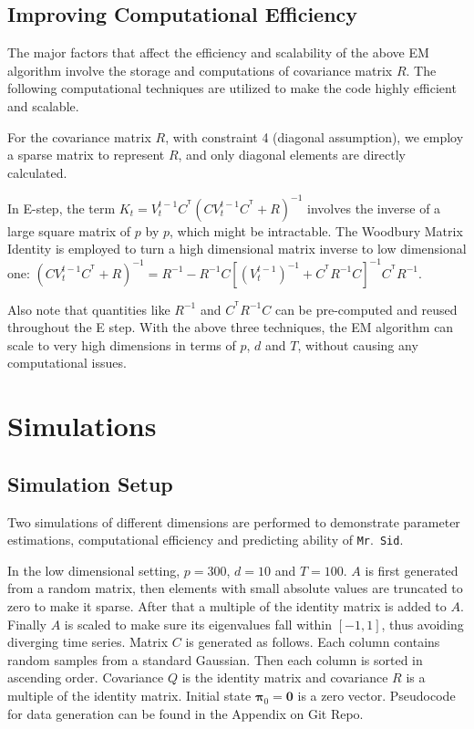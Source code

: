\documentclass[fleqn,12pt]{article}
\newcommand{\T}{^{\ensuremath{\mathsf{T}}}}           %
\newcommand{\mrsid}{{\sc \texttt{Mr}.~\texttt{Sid}}}
\begin{document}
\subsection{Improving Computational Efficiency}
The major factors that affect the efficiency and scalability of the above EM algorithm involve the storage and computations of covariance matrix $R$. The following computational techniques are utilized to make the code highly efficient and scalable.

For the covariance matrix $R$, with constraint 4 (diagonal assumption), we employ a sparse matrix to represent $R$, and only diagonal elements are directly calculated. 

In E-step, the term $K_t=V_t^{t-1}C^{\T}(CV_t^{t-1}C^{\T}+R)^{-1}$ involves the inverse of a large square matrix of $p$ by $p$, which might be intractable. The Woodbury Matrix Identity is employed to turn a high dimensional matrix inverse to low dimensional one: $(CV_t^{t-1}C^{\T}+R)^{-1} = R^{-1} - R^{-1}C[(V_t^{t-1})^{-1} + C^{\T}R^{-1}C]^{-1}C^{\T}R^{-1}$.

Also note that quantities like $R^{-1}$ and $C^{\T}R^{-1}C$ can be pre-computed and reused throughout the E step. With the above three techniques, the EM algorithm can scale to very high dimensions in terms of $p$, $d$ and $T$, without causing any computational issues.


\section{Simulations}
\subsection{Simulation Setup}
\label{sec:simsetup}
Two simulations of different dimensions are performed to demonstrate parameter estimations, computational efficiency and predicting ability of \mrsid.

In the low dimensional setting, $p = 300$, $d = 10$ and $T = 100$. $A$ is first generated from a random matrix, then elements with small absolute values are truncated to zero to make it sparse. After that a multiple of the identity matrix is added to $A$. Finally $A$ is scaled to make sure its eigenvalues fall within $[-1,1]$, thus avoiding diverging time series. Matrix $C$ is generated as follows. Each column contains random samples from a standard Gaussian. Then each column is sorted in ascending order. Covariance $Q$ is the identity matrix and covariance $R$ is a multiple of the identity matrix. Initial state $\mathbf{\pi}_0 = \mathbf{0}$ is a zero vector. Pseudocode for data generation can be found in the Appendix on Git Repo.
\end{document}
